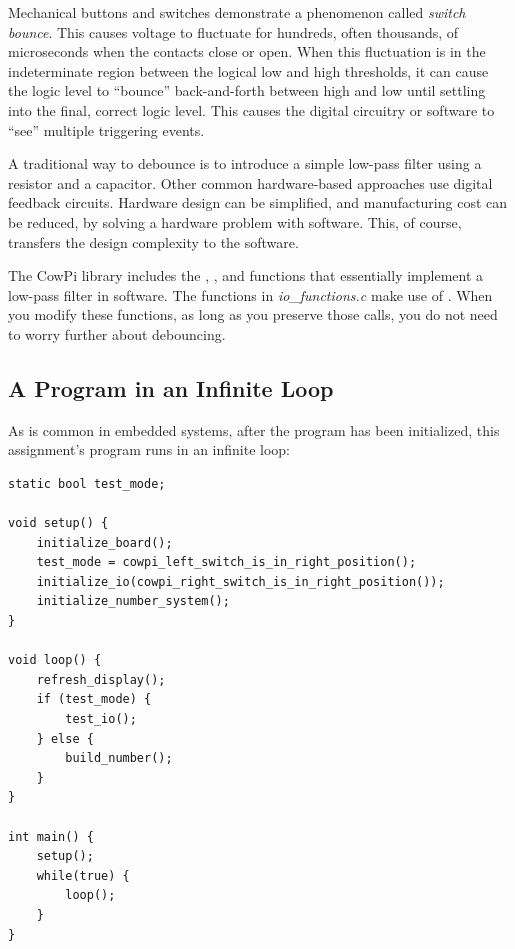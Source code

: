Mechanical buttons and switches demonstrate a phenomenon called \textit{switch bounce}.
This causes voltage to fluctuate for hundreds, often thousands, of microseconds when the contacts close or open.
When this fluctuation is in the indeterminate region between the logical low and high thresholds, it can cause the logic level to ``bounce'' back-and-forth between high and low until settling into the final, correct logic level.
This causes the digital circuitry or software to ``see'' multiple triggering events.

A traditional way to debounce is to introduce a simple low-pass filter using a resistor and a capacitor.
Other common hardware-based approaches use digital feedback circuits.
Hardware design can be simplified, and manufacturing cost can be reduced, by solving a hardware problem with software.
This, of course, transfers the design complexity to the software.

The CowPi library includes the , , and   functions that essentially implement a low-pass filter in software.
The functions in \textit{io\_functions.c} make use of .
When you modify these functions, as long as you preserve those  calls, you do not need to worry further about debouncing.


\subsection{A Program in an Infinite Loop} \label{subsec:infiniteLoop}

As is common in embedded systems, after the program has been initialized, this assignment's program runs in an infinite loop:

\begin{lstlisting}[numbers=none, basicstyle=\ttfamily\small]
static bool test_mode;

void setup() {
    initialize_board();
    test_mode = cowpi_left_switch_is_in_right_position();
    initialize_io(cowpi_right_switch_is_in_right_position());
    initialize_number_system();
}

void loop() {
    refresh_display();
    if (test_mode) {
        test_io();
    } else {
        build_number();
    }
}

int main() {
    setup();
    while(true) {
        loop();
    }
}
\end{lstlisting}


